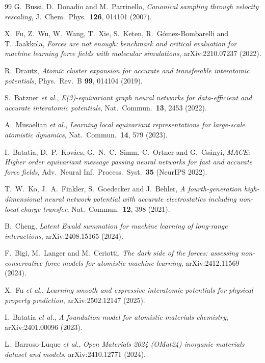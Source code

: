 \documentclass[11pt,a4paper]{article}
\begin{document}
\begin{thebibliography}{99}
 G.~Bussi, D.~Donadio and M.~Parrinello,
  \emph{Canonical sampling through velocity rescaling}, J.\ Chem.\ Phys.\
  \textbf{126}, 014101 (2007).

 X.~Fu, Z.~Wu, W.~Wang, T.~Xie, S.~Keten,
  R.~G\'omez-Bombarelli and T.~Jaakkola,
  \emph{Forces are not enough: benchmark and critical evaluation for machine
  learning force fields with molecular simulations}, arXiv:2210.07237 (2022).

 R.~Drautz,
  \emph{Atomic cluster expansion for accurate and transferable interatomic
  potentials}, Phys.\ Rev.\ B \textbf{99}, 014104 (2019).

 S.~Batzner \emph{et al.},
  \emph{E(3)-equivariant graph neural networks for data-efficient and accurate
  interatomic potentials}, Nat.\ Commun.\ \textbf{13}, 2453 (2022).

 A.~Musaelian \emph{et al.},
  \emph{Learning local equivariant representations for large-scale atomistic
  dynamics}, Nat.\ Commun.\ \textbf{14}, 579 (2023).

 I.~Batatia, D.~P.~Kov\'acs, G.~N.~C.~Simm, C.~Ortner and
  G.~Cs\'anyi, \emph{MACE: Higher order equivariant message passing neural
  networks for fast and accurate force fields}, Adv.\ Neural Inf.\ Process.\
  Syst.\ \textbf{35} (NeurIPS 2022).

 T.~W.~Ko, J.~A.~Finkler, S.~Goedecker and J.~Behler,
  \emph{A fourth-generation high-dimensional neural network potential with
  accurate electrostatics including non-local charge transfer},
  Nat.\ Commun.\ \textbf{12}, 398 (2021).

 B.~Cheng,
  \emph{Latent Ewald summation for machine learning of long-range
  interactions}, arXiv:2408.15165 (2024).

 F.~Bigi, M.~Langer and M.~Ceriotti,
  \emph{The dark side of the forces: assessing non-conservative force models
  for atomistic machine learning}, arXiv:2412.11569 (2024).

 X.~Fu \emph{et al.},
  \emph{Learning smooth and expressive interatomic potentials for physical
  property prediction}, arXiv:2502.12147 (2025).

 I.~Batatia \emph{et al.},
  \emph{A foundation model for atomistic materials chemistry},
  arXiv:2401.00096 (2023).

 L.~Barroso-Luque \emph{et al.},
  \emph{Open Materials 2024 (OMat24) inorganic materials dataset and models},
  arXiv:2410.12771 (2024).


\end{thebibliography}
\end{document}
